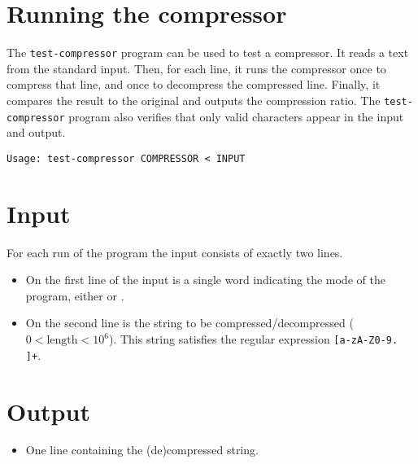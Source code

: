 \section*{Running the compressor}
The \texttt{test-compressor} program can be used to test a compressor.
It reads a text from the standard input. Then, for each line, it runs the compressor once to compress that line, and once to decompress the compressed line.  Finally, it compares the result to the original and outputs the compression ratio.  The \texttt{test-compressor} program also verifies that only valid characters appear in the input and output.

\begin{verbatim}
Usage: test-compressor COMPRESSOR < INPUT
\end{verbatim}

\section*{Input}
For each run of the program the input consists of exactly two lines.
\begin{itemize}
 \item On the first line of the input is a single word indicating the mode of the program, either  or .
 \item On the second line is the string to be compressed/decompressed ($0<\mbox{length}<10^6$). This string satisfies the regular expression \texttt{[a-zA-Z0-9. ]+}.
\end{itemize}

\section*{Output}
\begin{itemize}
 \item One line containing the (de)compressed string.
\end{itemize}

